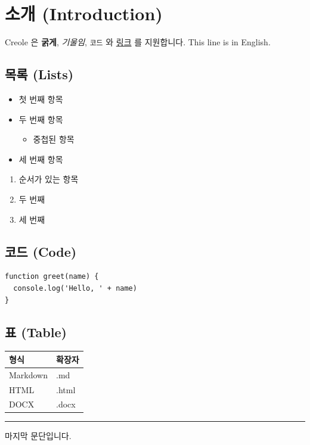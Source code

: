\documentclass[11pt]{article}
\date{}
\begin{document}
\section*{소개 (Introduction)}\label{소개-introduction}

Creole 은 \textbf{굵게}, \emph{기울임}, \verb|코드| 와
\href{https://example.com}{링크} 를 지원합니다.
This line is in English.

\subsection*{목록 (Lists)}\label{목록-lists}

\begin{itemize}
\item 첫 번째 항목
\item 두 번째 항목
\begin{itemize}
\item 중첩된 항목
\end{itemize}
\item 세 번째 항목
\end{itemize}

\begin{enumerate}
\item 순서가 있는 항목
\item 두 번째
\item 세 번째
\end{enumerate}

\subsection*{코드 (Code)}\label{코드-code}

\begin{verbatim}
function greet(name) {
  console.log('Hello, ' + name)
}
\end{verbatim}

\subsection*{표 (Table)}\label{표-table}

\begin{table}[htbp]
\centering
\begin{tabular}{ll}
\toprule
형식 & 확장자 \\
\midrule
Markdown & .md \\
HTML & .html \\
DOCX & .docx \\
\bottomrule
\end{tabular}
\end{table}

\begin{center}\rule{0.5\linewidth}{0.5pt}\end{center}

마지막 문단입니다.
\end{document}

